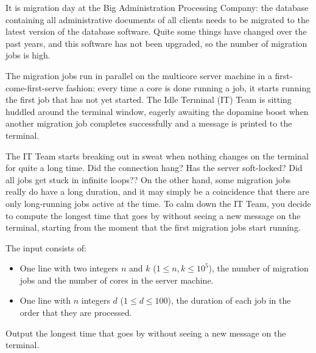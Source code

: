 

\newcommand{\maxn}{10^5}
\newcommand{\maxk}{n}
\newcommand{\maxt}{100}

It is migration day at the Big Administration Processing Company:
the database containing all administrative documents of all clients
needs to be migrated to the latest version of the database software.
Quite some things have changed over the past years, and this software has not been upgraded,
so the number of migration jobs is high.

The migration jobs run in parallel on the multicore server machine in a
first-come-first-serve fashion: every time a core is done running a job, it
starts running the first job that has not yet started. The Idle Terminal (IT)
Team is sitting huddled around the terminal window, eagerly awaiting the
dopamine boost when another migration job completes successfully and a message
is printed to the terminal.

The IT Team starts breaking out in sweat when nothing changes on the terminal for quite a long time.
Did the connection hang?
Has the server soft-locked?
Did all jobs get stuck in infinite loops??
On the other hand, some migration jobs really do have a long duration,
and it may simply be a coincidence that there are only long-running jobs active at the time.
To calm down the IT Team, you decide to compute the longest time that goes by
without seeing a new message on the terminal,
starting from the moment that the first migration jobs start running.

\begin{Input}
    The input consists of:
    \begin{itemize}
        \item One line with two integers $n$ and $k$ ($1 \leq n, k \leq \maxn$),
        the number of migration jobs and the number of cores in the server machine.
        \item One line with $n$ integers $d$ ($1 \leq d \leq \maxt$),
        the duration of each job in the order that they are processed.
    \end{itemize}
\end{Input}

\begin{Output}
    Output the longest time that goes by without seeing a new message on the terminal.
\end{Output}
